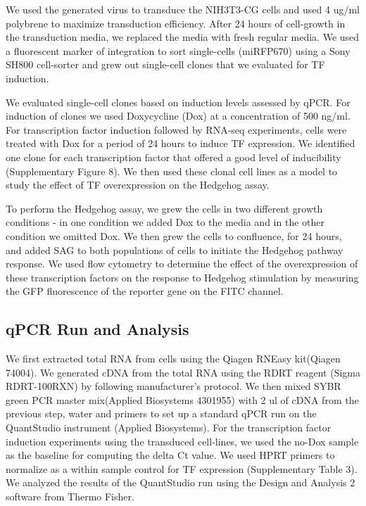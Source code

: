 We used the generated virus to transduce the NIH3T3-CG cells and used 4 ug/ml polybrene to maximize transduction efficiency. After 24 hours of cell-growth in the transduction media, we replaced the media with fresh regular media. We used a fluorescent marker of integration to sort single-cells (miRFP670) using a Sony SH800 cell-sorter and grew out single-cell clones that we evaluated for TF induction. 

We evaluated single-cell clones based on induction levels assessed by qPCR. For induction of clones we used Doxycycline (Dox) at a concentration of 500 ng/ml. For transcription factor induction followed by RNA-seq experiments, cells were treated with Dox for a period of 24 hours to induce TF expression. We identified one clone for each transcription factor that offered a good level of inducibility (Supplementary Figure 8). We then used these clonal cell lines as a model to study the effect of TF overexpression on the Hedgehog assay. 

To perform the Hedgehog assay, we grew the cells in two different growth conditions - in one condition we added Dox to the media and in the other condition we omitted Dox. We then grew the cells to confluence, for 24 hours, and added SAG to both populations of cells to initiate the Hedgehog pathway response. We used flow cytometry to determine the effect of the overexpression of these transcription factors on the response to Hedgehog stimulation by measuring the GFP fluorescence of the reporter gene on the FITC channel. 

\subsection{qPCR Run and Analysis}
We first extracted total RNA from cells using the Qiagen RNEasy kit(Qiagen 74004). We generated cDNA from the total RNA using the RDRT reagent (Sigma RDRT-100RXN) by following manufacturer's protocol. We then mixed SYBR green PCR master mix(Applied Biosystems 4301955) with 2 ul of cDNA from the previous step, water and primers to set up a standard qPCR run on the QuantStudio instrument (Applied Biosystems). For the transcription factor induction experiments using the transduced cell-lines, we used the no-Dox sample as the baseline for computing the delta Ct value. We used HPRT primers to normalize as a within sample control for TF expression (Supplementary Table 3). We analyzed the results of the QuantStudio run using the Design and Analysis 2 software from Thermo Fisher.

